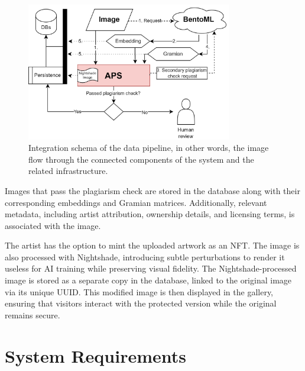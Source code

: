 \begin{figure}[ht]
    \centering
    \includegraphics[width=0.8\textwidth]{figs/integ.png}
    \caption{Integration schema of the data pipeline, in other words, the image flow through the connected components of the system and the related infrastructure.}
    \label{fig:pipeline}
\end{figure}

Images that pass the plagiarism check are stored in the database along with their corresponding embeddings and Gramian matrices. Additionally, relevant metadata, including artist attribution, ownership details, and licensing terms, is associated with the image.

The artist has the option to mint the uploaded artwork as an NFT. The image is also processed with Nightshade, introducing subtle perturbations to render it useless for AI training while preserving visual fidelity. The Nightshade-processed image is stored as a separate copy in the database, linked to the original image via its unique UUID. This modified image is then displayed in the gallery, ensuring that visitors interact with the protected version while the original remains secure.

\chapter{System Requirements}
